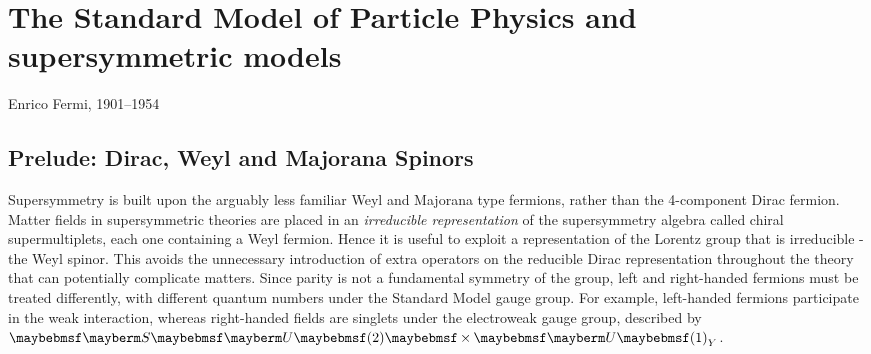 \chapter{The Standard Model of Particle Physics and supersymmetric models}
\label{chap:SMandSUSY}



%
{Enrico Fermi, 1901--1954}

\section{Prelude: Dirac, Weyl and Majorana Spinors}
\label{sec:diracweyl}

Supersymmetry is built upon the arguably less familiar Weyl and Majorana type fermions, rather than the 4-component Dirac fermion. Matter fields in supersymmetric theories are placed in an \textit{irreducible representation} of the supersymmetry algebra called chiral supermultiplets, each one containing a Weyl fermion. Hence it is useful to exploit a representation of the Lorentz group that is irreducible - the Weyl spinor. This avoids the unnecessary introduction of extra operators on the reducible Dirac representation throughout the theory that can potentially complicate matters. Since parity is not a fundamental symmetry of the group, left and right-handed fermions must be treated differently, with different quantum numbers under the Standard Model gauge group. For example, left-handed fermions participate in the weak interaction, whereas right-handed fields are singlets under the electroweak gauge group, described by $\SUgroup{2} \times \Ugroup{1}_Y$.

